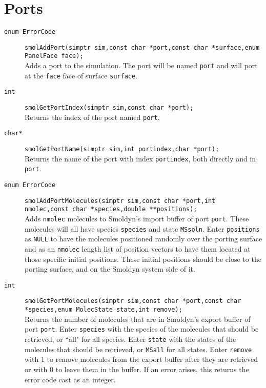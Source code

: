 \documentclass {book}
\begin{document}
\section{Ports}

\begin{description}

\item[\texttt{enum ErrorCode}]
\texttt{smolAddPort(simptr sim,const char *port,const char *surface,enum PanelFace face);}
\hfill \\
Adds a port to the simulation. The port will be named \texttt{port} and will port at the \texttt{face} face of surface \texttt{surface}.

\item[\texttt{int}]
\texttt{smolGetPortIndex(simptr sim,const char *port);}
\hfill \\
Returns the index of the port named \texttt{port}.

\item[\texttt{char*}]
\texttt{smolGetPortName(simptr sim,int portindex,char *port);}
\hfill \\
Returns the name of the port with index \texttt{portindex}, both directly and in \texttt{port}.

\item[\texttt{enum ErrorCode}]
\texttt{smolAddPortMolecules(simptr sim,const char *port,int nmolec,const char *species,double **positions);}
\hfill \\
Adds \texttt{nmolec} molecules to Smoldyn's import buffer of port \texttt{port}. These molecules will all have species \texttt{species} and state \texttt{MSsoln}. Enter \texttt{positions} as \texttt{NULL} to have the molecules positioned randomly over the porting surface and as an \texttt{nmolec} length list of position vectors to have them located at those specific initial positions. These initial positions should be close to the porting surface, and on the Smoldyn system side of it.

\item[\texttt{int}]
\texttt{smolGetPortMolecules(simptr sim,const char *port,const char *species,enum MolecState state,int remove);}
\hfill \\
Returns the number of molecules that are in Smoldyn's export buffer of port \texttt{port}. Enter \texttt{species} with the species of the molecules that should be retrieved, or ``all" for all species. Enter \texttt{state} with the states of the molecules that should be retrieved, or \texttt{MSall} for all states. Enter \texttt{remove} with 1 to remove molecules from the export buffer after they are retrieved or with 0 to leave them in the buffer. If an error arises, this returns the error code cast as an integer.

\end{description}
\end{document}
